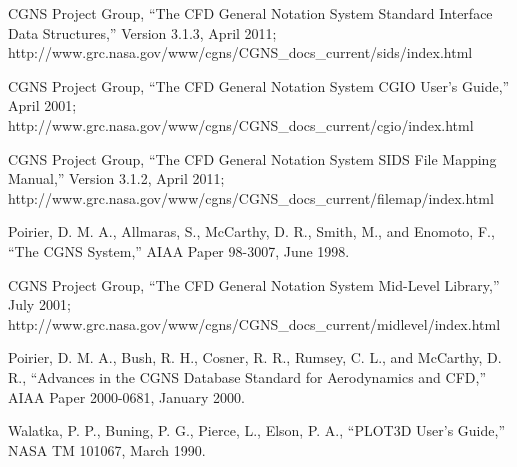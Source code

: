 \documentclass[12pt]{article}
\begin{document}
\begin{thebibliography}{99}

CGNS Project Group,
``The CFD General Notation System Standard Interface Data Structures,''
Version 3.1.3, April 2011;
http://www.grc.nasa.gov/www/cgns/CGNS\_docs\_current/sids/index.html

CGNS Project Group,
``The CFD General Notation System CGIO User's Guide,''
April 2001;
http://www.grc.nasa.gov/www/cgns/CGNS\_docs\_current/cgio/index.html

CGNS Project Group,
``The CFD General Notation System SIDS File Mapping Manual,''
Version 3.1.2, April 2011;
http://www.grc.nasa.gov/www/cgns/CGNS\_docs\_current/filemap/index.html

Poirier, D. M. A., Allmaras, S., McCarthy, D. R., Smith, M., and
Enomoto, F.,
``The CGNS System,''
AIAA Paper 98-3007, June 1998.

CGNS Project Group,
``The CFD General Notation System Mid-Level Library,''
July 2001;
http://www.grc.nasa.gov/www/cgns/CGNS\_docs\_current/midlevel/index.html

Poirier, D. M. A., Bush, R. H., Cosner, R. R., Rumsey, C. L., and
McCarthy, D. R.,
``Advances in the CGNS Database Standard for Aerodynamics and CFD,''
AIAA Paper 2000-0681, January 2000.

Walatka, P. P., Buning, P. G., Pierce, L., Elson, P. A.,
``PLOT3D User's Guide,''
NASA TM 101067, March 1990.

\end{thebibliography}
%
\end{document}
